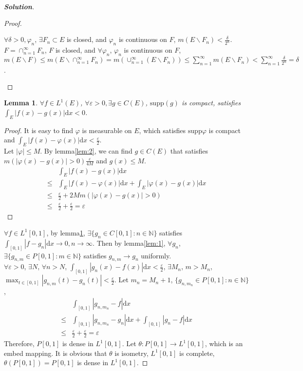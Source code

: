\documentclass{ctexart}
\newenvironment{solution}{\begin{proof}[\textbf{Solution}]}{\end{proof}}
\renewcommand\phi{\varphi}
\renewcommand{\(}{\left(}
\renewcommand{\)}{\right)}
\renewcommand{\d}{\mathrm{d}}
\newcommand{\supp}{\mathrm{supp}}
\newcommand{\N}{\mathbb{N}}
\renewcommand{\epsilon}{\varepsilon}
\newcommand{\minus}{\mathbin{\backslash}}
\newtheorem{lemma}{Lemma}
\begin{document}
\begin{solution}
\begin{proof}
\begin{itemize}
        $\forall \delta>0, \phi_n$, $\exists F_n\subset E$ is closed, and $\phi_n$ is continuous on $F$, $m(E\minus F_n)<\frac{\delta}{2^n}$.
        $F=\cap_{n=1}^{\infty}F_n$, $F$ is closed, and $\forall \phi_n$, $\phi_n$ is continuous on $F$,
        $m(E\minus F)\leq m(E\minus\cap_{n=1}^{\infty}F_n)=m(\cup_{n=1}^{\infty}(E\minus F_n))\leq\sum_{n=1}^{\infty}m(E\minus F_n)<\sum_{n=1}^{\infty}\frac{\delta}{2^n}=\delta$.
    \end{itemize}
  \end{proof}
  \begin{lemma}\label{lem:3}
    $\forall f \in L^1(E)$, $\forall \epsilon>0, \exists g\in C(E)$, $\supp (g)$ is compact, satisfies \\
    $\int_E|f(x)-g(x)|\d x<0$.
  \end{lemma}
  \begin{proof}
    It is easy to find $\phi$ is measurable on $E$, which satisfies $\supp \phi$ is compact and $\int_E |f(x)-\phi(x)|\d x<\frac{\epsilon}{2}$.\\
    Let $|\phi|\leq M$. By lemma\ref{lem:2}, we can find $g\in C(E)$ that satisfies $m(|\phi(x)-g(x)|>0)\frac{\epsilon}{4M}$ and $g(x)\leq M$.
    \begin{equation}
      \begin{aligned}
             & \int_E |f(x)-g(x)|\d x                            \\
        \leq & \int_E|f(x)-\phi(x)|\d x+\int_E|\phi(x)-g(x)|\d x \\
        \leq & \frac{\epsilon}{2}+2Mm(|\phi(x)-g(x)|>0)          \\
        \leq & \frac{\epsilon}{2}+\frac{\epsilon}{2}=\epsilon
      \end{aligned}
    \end{equation}
  \end{proof}
  $\forall f\in L^1[0,1]$, by lemma\ref{lem:3}, $\exists \{g_n\in C[0,1]: n\in\N\}$ satisfies $\int_{[0,1]}|f-g_n|\d x\to 0, n\to\infty$.
  Then by lemma\ref{lem:1}, $\forall g_n$, $\exists \{g_{n,m}\in P[0,1]:m\in\N\}$ satisfies $g_{n,m}\to g_n$ uniformly.\\
  $\forall \epsilon>0$, $\exists N$, $\forall n>N$, $\int_{[0,1]}|g_n(x)-f(x)|\d x<\frac{\epsilon}{2}$, $\exists M_n$, $m>M_n$, $\max_{t\in[0,1]}|g_{n,m}(t)-g_n(t)|<\frac{\epsilon}{2}$. Let $m_n=M_n+1$, $\{g_{n,m_n}\in P[0,1]:n\in\N\}$,
  \begin{equation}
    \begin{aligned}
           & \int_{[0,1]}|g_{n,m_n}-f|\d x                             \\
      \leq & \int_{[0,1]}|g_{n,m_n}-g_n|\d x+\int_{[0,1]}|g_{n}-f|\d x \\
      \leq & \frac{\epsilon}{2}+\frac{\epsilon}{2}=\epsilon
    \end{aligned}
  \end{equation}
  Therefore, $P[0,1]$ is dense in $L^1[0,1]$.
  Let $\theta: P[0,1]\to L^{1}[0,1]$, which is an embed mapping. It is obvious that $\theta$ is isometry, $L^1[0,1]$ is complete, $\theta(P[0,1])=P[0,1]$ is dense in $L^1[0,1]$.

\end{solution}
\end{document}
